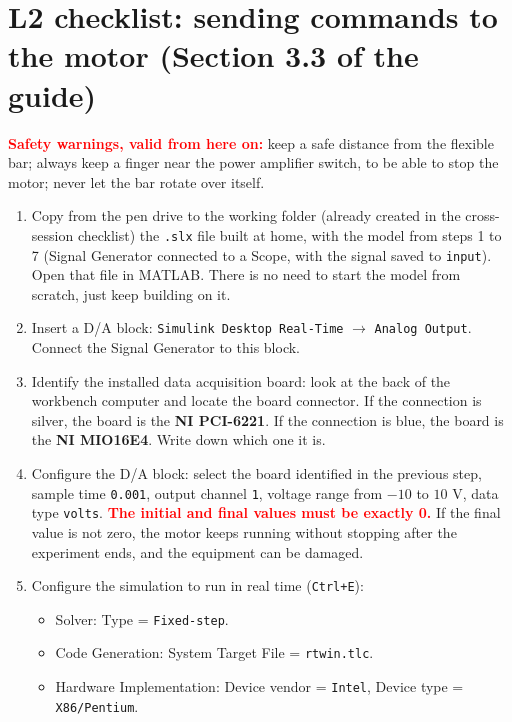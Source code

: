 \documentclass[a4paper,11pt]{article}
\begin{document}
\section*{L2 checklist: sending commands to the motor (Section 3.3 of the guide)}

\textcolor{red}{\textbf{Safety warnings, valid from here on:}} keep a safe distance
from the flexible bar; always keep a finger near the power amplifier switch, to be
able to stop the motor; never let the bar rotate over itself.

\begin{enumerate}[label=$\square$, leftmargin=1.5em]
  \item Copy from the pen drive to the working folder (already created in the
  cross-session checklist) the \texttt{.slx} file built at home, with the model
  from steps 1 to 7 (Signal Generator connected to a Scope, with the signal saved
  to \texttt{input}). Open that file in MATLAB. There is no need to start the
  model from scratch, just keep building on it.

  \item Insert a D/A block: \texttt{Simulink Desktop Real-Time} $\to$
  \texttt{Analog Output}. Connect the Signal Generator to this block.

  \item Identify the installed data acquisition board: look at the back of the
  workbench computer and locate the board connector. If the connection is silver,
  the board is the \textbf{NI PCI-6221}. If the connection is blue, the board is
  the \textbf{NI MIO16E4}. Write down which one it is.

  \item Configure the D/A block: select the board identified in the previous step,
  sample time \texttt{0.001}, output channel \texttt{1}, voltage range from
  $-10$ to $10$ V, data type \texttt{volts}. \textcolor{red}{\textbf{The initial
  and final values must be exactly 0.}} If the final value is not zero, the motor
  keeps running without stopping after the experiment ends, and the equipment can
  be damaged.

  \item Configure the simulation to run in real time (\texttt{Ctrl+E}):
  \begin{itemize}
    \item Solver: Type = \texttt{Fixed-step}.
    \item Code Generation: System Target File = \texttt{rtwin.tlc}.
    \item Hardware Implementation: Device vendor = \texttt{Intel}, Device type =
    \texttt{X86/Pentium}.
  \end{itemize}


\end{enumerate}
\end{document}
